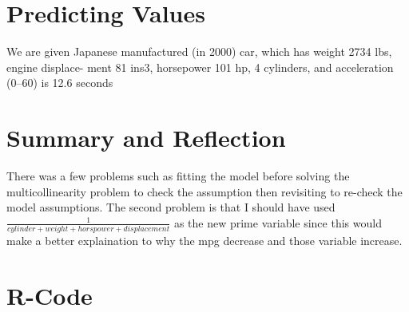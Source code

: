 \documentclass[11pt]{article} %
\begin{document}
\section{Predicting Values}
We are given Japanese manufactured (in 2000) car, which has weight 2734 lbs, engine displace- ment 81 ins3, horsepower 101 hp, 4 cylinders, and acceleration (0–60) is 12.6 seconds

\section{Summary and Reflection}
There was a few problems such as fitting the model before solving the multicollinearity problem to check the assumption then revisiting to re-check the model assumptions. The second problem is that I should have used $\frac{1}{cylinder+weight+horspower+displacement}$ as the new prime variable since this would make a better explaination to why the mpg decrease and those variable increase.
\newpage
\section{R-Code}
\end{document}
